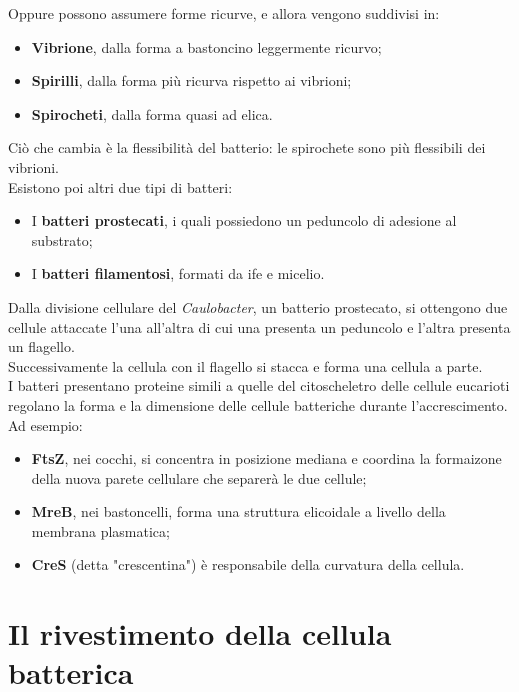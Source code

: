 \documentclass[11pt]{book}
\begin{document}
\vspace{1em}
Oppure possono assumere forme ricurve, e allora vengono suddivisi in:
\begin{itemize}
\item \textbf{Vibrione}, dalla forma a bastoncino leggermente ricurvo;
\item \textbf{Spirilli}, dalla forma più ricurva rispetto ai vibrioni;
\item \textbf{Spirocheti}, dalla forma quasi ad elica.
\end{itemize}
Ciò che cambia è la flessibilità del batterio: le spirochete sono più flessibili dei vibrioni.\\

Esistono poi altri due tipi di batteri:
\begin{itemize}
\item I \textbf{batteri prostecati}, i quali possiedono un peduncolo di adesione al substrato;
\item I \textbf{batteri filamentosi}, formati da ife e micelio.
\end{itemize}

\vspace{1em}
Dalla divisione cellulare del \emph{Caulobacter}, un batterio prostecato, si ottengono due cellule attaccate l'una all'altra di cui una presenta un peduncolo e l'altra presenta un flagello. \\Successivamente la cellula con il flagello si stacca e forma una cellula a parte.\\

I batteri presentano proteine simili a quelle del citoscheletro delle cellule eucarioti regolano la forma e la dimensione delle cellule batteriche durante l'accrescimento.
\\Ad esempio:
\begin{itemize}
\item \textbf{FtsZ}, nei cocchi, si concentra in posizione mediana e coordina la formaizone della nuova parete cellulare che separerà le due cellule;
\item \textbf{MreB}, nei bastoncelli, forma una struttura elicoidale a livello della membrana plasmatica;
\item \textbf{CreS} (detta "crescentina") è responsabile della curvatura della cellula.
\end{itemize}

\chapter{Il rivestimento della cellula batterica}
\end{document}
